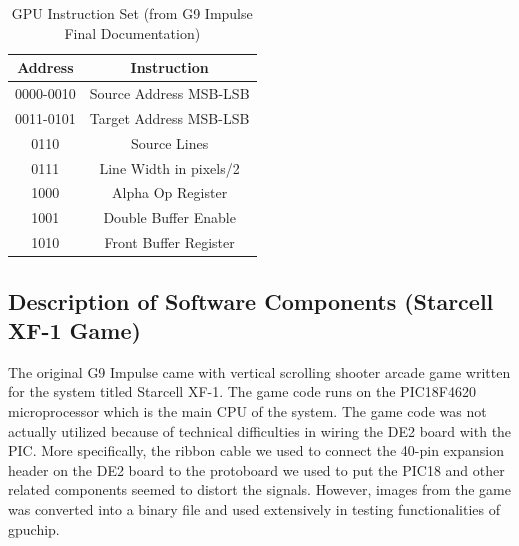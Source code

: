 \documentclass{report}
\begin{document}
\begin{table}[htb!]
    \begin{center}
        \begin{tabular}{ | c | c | }
            \hline
            Address & Instruction \\
            \hline
            0000-0010 & Source Address MSB-LSB \\
            \hline
            0011-0101 & Target Address MSB-LSB \\
            \hline
            0110 & Source Lines \\
            \hline
            0111 & Line Width in pixels/2 \\
            \hline
            1000 & Alpha Op Register \\
            \hline
            1001 & Double Buffer Enable \\
            \hline
            1010 & Front Buffer Register \\
            \hline
        \end{tabular}
    \end{center}
    \caption{GPU Instruction Set (from G9 Impulse Final Documentation)}
    \label{tab:gpu_instructions}
\end{table}

\subsection{Description of Software Components (Starcell XF-1 Game)}
The original G9 Impulse came with vertical scrolling shooter arcade game 
written for the system titled Starcell XF-1. The game code runs on the 
PIC18F4620 microprocessor which is the main CPU of the system. The game 
code was not actually utilized because of technical difficulties in 
wiring the DE2 board with the PIC. More specifically, the ribbon cable 
we used to connect the 40-pin expansion header on the DE2 board to the 
protoboard we used to put the PIC18 and other related components seemed 
to distort the signals. However, images from the game was converted into 
a binary file and used extensively in testing functionalities of 
gpuchip.
\end{document}
